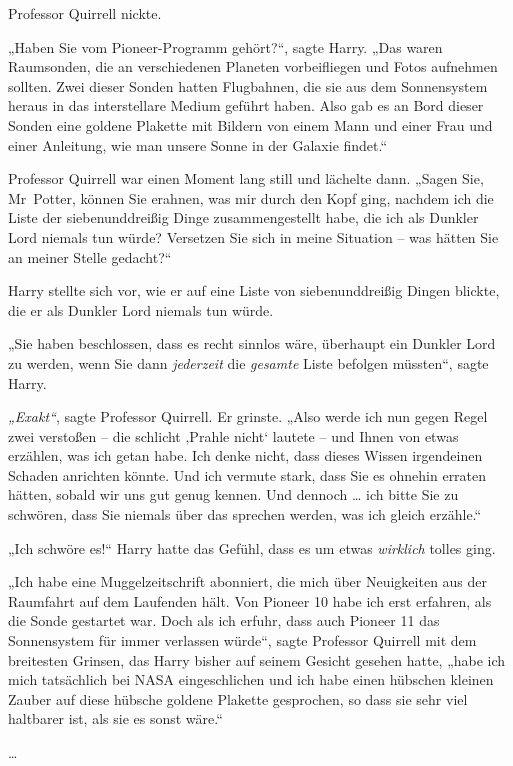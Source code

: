 {Professor Quirrell nickte.

„Haben Sie vom Pioneer-Programm gehört?“, sagte Harry. „Das waren Raumsonden, die an verschiedenen Planeten vorbeifliegen und Fotos aufnehmen sollten. Zwei dieser Sonden hatten Flugbahnen, die sie aus dem Sonnensystem heraus in das interstellare Medium geführt haben. Also gab es an Bord dieser Sonden eine goldene Plakette mit Bildern von einem Mann und einer Frau und einer Anleitung, wie man unsere Sonne in der Galaxie findet.“

Professor Quirrell war einen Moment lang still und lächelte dann. „Sagen Sie, Mr~Potter, können Sie erahnen, was mir durch den Kopf ging, nachdem ich die Liste der siebenunddreißig Dinge zusammengestellt habe, die ich als Dunkler Lord niemals tun würde? Versetzen Sie sich in meine Situation -- was hätten Sie an meiner Stelle gedacht?“

Harry stellte sich vor, wie er auf eine Liste von siebenunddreißig Dingen blickte, die er als Dunkler Lord niemals tun würde.

„Sie haben beschlossen, dass es recht sinnlos wäre, überhaupt ein Dunkler Lord zu werden, wenn Sie dann \emph{jederzeit} die \emph{gesamte} Liste befolgen müssten“, sagte Harry.

\emph{„Exakt“}, sagte Professor Quirrell. Er grinste. „Also werde ich nun gegen Regel zwei verstoßen -- die schlicht ‚Prahle nicht` lautete -- und Ihnen von etwas erzählen, was ich getan habe. Ich denke nicht, dass dieses Wissen irgendeinen Schaden anrichten könnte. Und ich vermute stark, dass Sie es ohnehin erraten hätten, sobald wir uns gut genug kennen. Und dennoch … ich bitte Sie zu schwören, dass Sie niemals über das sprechen werden, was ich gleich erzähle.“

„Ich schwöre es!“ Harry hatte das Gefühl, dass es um etwas \emph{wirklich} tolles ging.

„Ich habe eine Muggelzeitschrift abonniert, die mich über Neuigkeiten aus der Raumfahrt auf dem Laufenden hält. Von Pioneer 10 habe ich erst erfahren, als die Sonde gestartet war. Doch als ich erfuhr, dass auch Pioneer 11 das Sonnensystem für immer verlassen würde“, sagte Professor Quirrell mit dem breitesten Grinsen, das Harry bisher auf seinem Gesicht gesehen hatte, „habe ich mich tatsächlich bei NASA eingeschlichen und ich habe einen hübschen kleinen Zauber auf diese hübsche goldene Plakette gesprochen, so dass sie sehr viel haltbarer ist, als sie es sonst wäre.“

…

}
